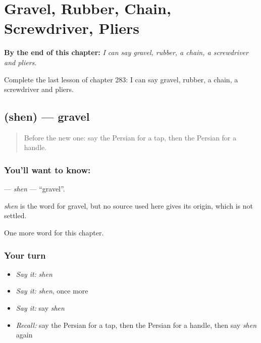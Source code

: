 
\chapter{Gravel, Rubber, Chain, Screwdriver, Pliers}
\label{ch:fa-gravel-rubber-chain-screwdriver-pliers}

\begin{chapteropening}
\textbf{By the end of this chapter:} \emph{I can say gravel, rubber, a chain, a screwdriver and pliers.}

Complete the last lesson of chapter 283: I can say gravel, rubber, a chain, a screwdriver and pliers.
\end{chapteropening}

\section[\texorpdfstring{\fa{شن} (shen)}{شن (shen)}]{ (shen) — gravel}

\label{lesson:FA-C283-shen}



\begin{quote}
Before the new one: say the Persian for a tap, then the Persian for a handle.
\end{quote}

\subsection*{You'll want to know: }
\textbf{} — \emph{shen} — \textquotedblleft{}gravel\textquotedblright{}.

\begin{cousinweb}
\emph{shen} is the word for gravel, but no source used here gives its origin, which is not settled.
\end{cousinweb}

\begin{grammarlens}[title={What you've built}]
One more word for this chapter.
\end{grammarlens}

\subsection*{Your turn}
\begin{itemize}
\raggedright
  \item \emph{Say it:} \emph{shen}
  \item \emph{Say it:} \emph{shen}, once more
  \item \emph{Say it:} say \emph{shen}
  \item \emph{Recall:} say the Persian for a tap, then the Persian for a handle, then say \emph{shen} again
\end{itemize}

